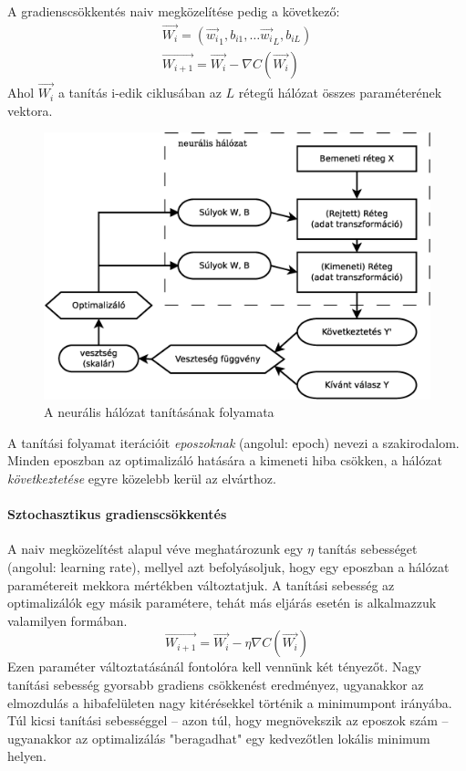 A gradienscsökkentés naiv megközelítése pedig a következő:
\begin{align*}
	\vec{W_i}=(\vec{w_i}_1,b_{i1},\dots\vec{w_i}_L,b_{iL})\\
	\vec{W_{i+1}} = \vec{W_i} - \nabla C(\vec{W_i})
\end{align*}
Ahol $\vec{W_i}$ a tanítás i-edik ciklusában az $L$ rétegű hálózat összes paraméterének vektora.

\begin{figure}[h]
	\centering
	\includegraphics[width=0.7\linewidth]{fig/DNN_dia}
	\caption{A neurális hálózat tanításának folyamata}
	\label{fig:dnn}
\end{figure}

A tanítási folyamat iterációit \emph{eposzoknak} (angolul: epoch) nevezi a szakirodalom. Minden eposzban az optimalizáló hatására a kimeneti hiba csökken, a hálózat \emph{következtetése} egyre közelebb kerül az elvárthoz. 

\paragraph[SGD]{Sztochasztikus gradienscsökkentés}
A naiv megközelítést alapul véve meghatározunk egy $\eta$ tanítás sebességet (angolul: learning rate), mellyel azt befolyásoljuk, hogy egy eposzban a hálózat paramétereit mekkora mértékben változtatjuk. A tanítási sebesség az optimalizálók egy másik paramétere, tehát más eljárás esetén is alkalmazzuk valamilyen formában.
\begin{displaymath}
\vec{W_{i+1}} = \vec{W_i} - \eta\nabla C(\vec{W_i})
\end{displaymath}
Ezen paraméter változtatásánál fontolóra kell vennünk két tényezőt. Nagy tanítási sebesség gyorsabb gradiens csökkenést eredményez, ugyanakkor az elmozdulás a hibafelületen nagy kitérésekkel történik a minimumpont irányába. Túl kicsi tanítási sebességgel -- azon túl, hogy megnövekszik az eposzok szám --  ugyanakkor az optimalizálás "beragadhat" egy kedvezőtlen lokális minimum helyen.

